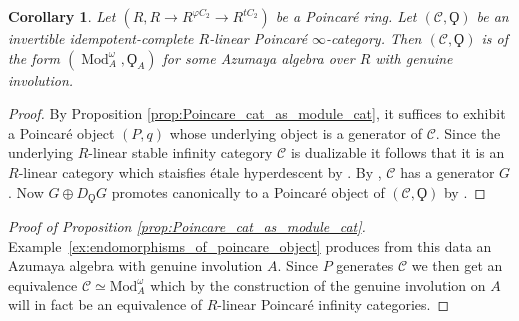 \documentclass{article}
\DeclareMathOperator{\Mod}{Mod} %
\newtheorem{corollary}[equation]{Corollary}
\theoremstyle{definition}
\newcommand{\Lucy}[1]{\todo[color=cyan!30]{\linespread{1}\footnotesize L: #1}}
\begin{document}
\begin{corollary}
    Let $ (R, R \to R^{\varphi C_2} \to R^{tC_2}) $ be a Poincaré ring.  
    Let $ \left(\mathcal{C}, \Qoppa\right) $ be an invertible idempotent-complete $ R $-linear Poincaré $ \infty $-category. 
    Then $ \left(\mathcal{C}, \Qoppa\right) $ is of the form $ \left(\Mod^\omega_A, \Qoppa_A \right) $ for some Azumaya algebra over $ R $ with genuine involution.      
\end{corollary}
\begin{proof}
    By Proposition \ref{prop:Poincare_cat_as_module_cat}, it suffices to exhibit a Poincaré object $ (P, q) $ whose underlying object is a generator of $ \mathcal{C} $. Since the underlying $R$-linear stable infinity category $\mathcal{C}$ is dualizable it follows that it is an $R$-linear category which staisfies {\'e}tale hyperdescent by \cite[Example 4.4]{Antieau_Gepner_Bruaer}.
    By \cite[Theorem 6.1]{MR3190610}, $ \mathcal{C} $ has a generator $ G $. 
    Now $ G \oplus D_{\Qoppa}G $ promotes canonically to a Poincaré object of $ \left(\mathcal{C}, \Qoppa\right) $ by \cite[Proposition 2.2.5]{CDHHLMNNSI}. 
\end{proof}
\begin{proof}[Proof of Proposition \ref{prop:Poincare_cat_as_module_cat}]
    Example~\ref{ex:endomorphisms_of_poincare_object} produces from this data an Azumaya algebra with genuine involution $A$. Since $P$ generates $\mathcal{C}$ we then get an equivalence $\mathcal{C}\simeq \mathrm{Mod}_A^\omega$ which by the construction of the genuine involution on $A$ will in fact be an equivalence of $R$-linear Poincar{\'e} infinity categories.
\end{proof}
\end{document}
